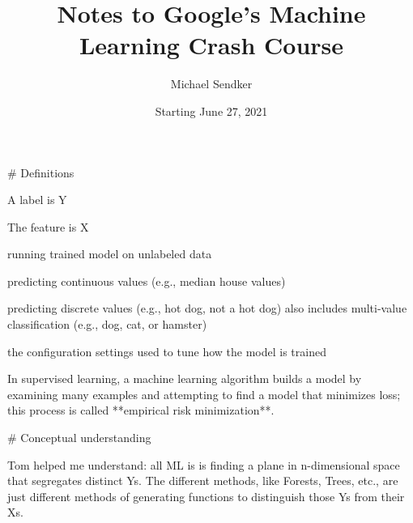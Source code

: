 

\title{Notes to Google's Machine Learning Crash Course}
\author{Michael Sendker}
\date{Starting June 27, 2021}


\begin{markdown}

\maketitle

# Definitions

\begin{definition}[label]
    A label is Y
\end{definition}

\begin{definition}[feature]
    The feature is X
\end{definition}

\begin{definition}[inference]
    running trained model on unlabeled data
\end{definition}

\begin{definition}[regression]
    predicting continuous values (e.g., median house values)
\end{definition}

\begin{definition}[classification]
    predicting discrete values (e.g., hot dog, not a hot dog) also includes
    multi-value classification (e.g., dog, cat, or hamster)
\end{definition}

\begin{definition}[hyperparameters]
    the configuration settings used to tune how the model is trained
\end{definition}

\begin{definition}
    In supervised learning, a machine learning algorithm builds a model by
    examining many examples and attempting to find a model that minimizes loss;
    this process is called **empirical risk minimization**.
\end{definition}

# Conceptual understanding

Tom helped me understand: all ML is is finding a plane in n-dimensional space
that segregates distinct Ys. The different methods, like Forests, Trees, etc.,
are just different methods of generating functions to distinguish those Ys from
their Xs.


\end{markdown}
